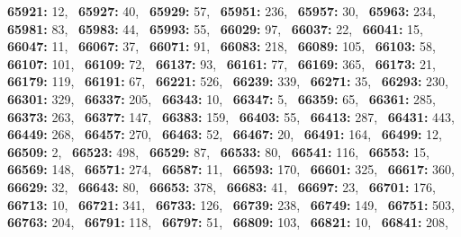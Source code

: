 \textbf{65921:} 12,\allowbreak~ 
\textbf{65927:} 40,\allowbreak~ 
\textbf{65929:} 57,\allowbreak~ 
\textbf{65951:} 236,\allowbreak~ 
\textbf{65957:} 30,\allowbreak~ 
\textbf{65963:} 234,\allowbreak~ 
\textbf{65981:} 83,\allowbreak~ 
\textbf{65983:} 44,\allowbreak~ 
\textbf{65993:} 55,\allowbreak~ 
\textbf{66029:} 97,\allowbreak~ 
\textbf{66037:} 22,\allowbreak~ 
\textbf{66041:} 15,\allowbreak~ 
\textbf{66047:} 11,\allowbreak~ 
\textbf{66067:} 37,\allowbreak~ 
\textbf{66071:} 91,\allowbreak~ 
\textbf{66083:} 218,\allowbreak~ 
\textbf{66089:} 105,\allowbreak~ 
\textbf{66103:} 58,\allowbreak~ 
\textbf{66107:} 101,\allowbreak~ 
\textbf{66109:} 72,\allowbreak~ 
\textbf{66137:} 93,\allowbreak~ 
\textbf{66161:} 77,\allowbreak~ 
\textbf{66169:} 365,\allowbreak~ 
\textbf{66173:} 21,\allowbreak~ 
\textbf{66179:} 119,\allowbreak~ 
\textbf{66191:} 67,\allowbreak~ 
\textbf{66221:} 526,\allowbreak~ 
\textbf{66239:} 339,\allowbreak~ 
\textbf{66271:} 35,\allowbreak~ 
\textbf{66293:} 230,\allowbreak~ 
\textbf{66301:} 329,\allowbreak~ 
\textbf{66337:} 205,\allowbreak~ 
\textbf{66343:} 10,\allowbreak~ 
\textbf{66347:} 5,\allowbreak~ 
\textbf{66359:} 65,\allowbreak~ 
\textbf{66361:} 285,\allowbreak~ 
\textbf{66373:} 263,\allowbreak~ 
\textbf{66377:} 147,\allowbreak~ 
\textbf{66383:} 159,\allowbreak~ 
\textbf{66403:} 55,\allowbreak~ 
\textbf{66413:} 287,\allowbreak~ 
\textbf{66431:} 443,\allowbreak~ 
\textbf{66449:} 268,\allowbreak~ 
\textbf{66457:} 270,\allowbreak~ 
\textbf{66463:} 52,\allowbreak~ 
\textbf{66467:} 20,\allowbreak~ 
\textbf{66491:} 164,\allowbreak~ 
\textbf{66499:} 12,\allowbreak~ 
\textbf{66509:} 2,\allowbreak~ 
\textbf{66523:} 498,\allowbreak~ 
\textbf{66529:} 87,\allowbreak~ 
\textbf{66533:} 80,\allowbreak~ 
\textbf{66541:} 116,\allowbreak~ 
\textbf{66553:} 15,\allowbreak~ 
\textbf{66569:} 148,\allowbreak~ 
\textbf{66571:} 274,\allowbreak~ 
\textbf{66587:} 11,\allowbreak~ 
\textbf{66593:} 170,\allowbreak~ 
\textbf{66601:} 325,\allowbreak~ 
\textbf{66617:} 360,\allowbreak~ 
\textbf{66629:} 32,\allowbreak~ 
\textbf{66643:} 80,\allowbreak~ 
\textbf{66653:} 378,\allowbreak~ 
\textbf{66683:} 41,\allowbreak~ 
\textbf{66697:} 23,\allowbreak~ 
\textbf{66701:} 176,\allowbreak~ 
\textbf{66713:} 10,\allowbreak~ 
\textbf{66721:} 341,\allowbreak~ 
\textbf{66733:} 126,\allowbreak~ 
\textbf{66739:} 238,\allowbreak~ 
\textbf{66749:} 149,\allowbreak~ 
\textbf{66751:} 503,\allowbreak~ 
\textbf{66763:} 204,\allowbreak~ 
\textbf{66791:} 118,\allowbreak~ 
\textbf{66797:} 51,\allowbreak~ 
\textbf{66809:} 103,\allowbreak~ 
\textbf{66821:} 10,\allowbreak~ 
\textbf{66841:} 208,\allowbreak~ 
